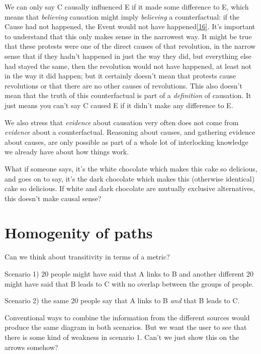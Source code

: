 \documentclass[
]{book}
\begin{document}
We can only say C causally influenced E if it made some difference to E, which means that \emph{believing} causation might imply \emph{believing} a counterfactual: if the Cause had not happened, the Event would not have happened{[}\protect\hyperlink{_ftn16}{16{]}}. It's important to understand that this only makes sense in the narrowest way. It might be true that these protests were one of the direct causes of that revolution, in the narrow sense that if they hadn't happened in just the way they did, but everything else had stayed the same, then the revolution would not have happened, at least not in the way it did happen; but it certainly doesn't mean that protests cause revolutions or that there are no other causes of revolutions. This also doesn't mean that the truth of this counterfactual is part of a \emph{definition} of causation. It just means you can't say C caused E if it didn't make any difference to E.

We also stress that \emph{evidence} about causation very often does not come from \emph{evidence} about a counterfactual. Reasoning about causes, and gathering evidence about causes, are only possible as part of a whole lot of interlocking knowledge we already have about how things work.

What if someone says, it's the white chocolate which makes this cake so delicious, and goes on to say, it's the dark chocolate which makes this (otherwise identical) cake so delicious. If white and dark chocolate are mutually exclusive alternatives, this doesn't make causal sense?

\hypertarget{homogenity-of-paths}{%
\section{Homogenity of paths}\label{homogenity-of-paths}}

Can we think about transitivity in terms of a metric?

Scenario 1) 20 people might have said that A links to B and another different 20 might have said that B leads to C with no overlap between the groups of people.

Scenario 2) the same 20 people say that A links to B \emph{and} that B leads to C.

Conventional ways to combine the information from the different sources would produce the same diagram in both scenarios. But we want the user to see that there is some kind of weakness in scenario 1. Can't we just show this on the arrows somehow?
\end{document}
